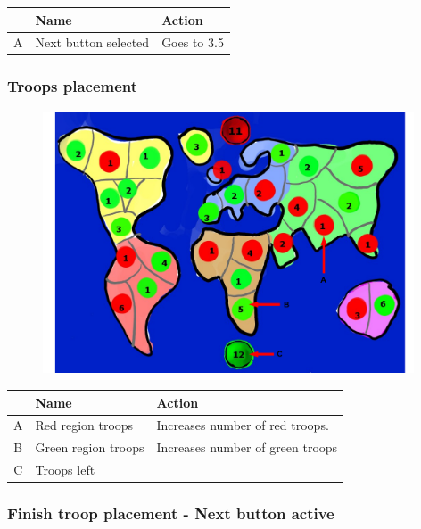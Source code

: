 \documentclass[12pt,a4paper]{article}
\begin{document}
\begin{table}[H]
\small
\centering
\begin{tabular}{c|p{5cm}|p{7cm}}
& Name & Action \\ \hline\hline
A
&Next button selected
&Goes to 3.5
\end{tabular}
\end{table}


\newpage
\subsubsection{Troops placement}

\begin{figure}[H]
  \centering
  \includegraphics[width=11cm]{pic/mocks/3-5.pdf}
\end{figure}

\begin{table}[H]
\small
\centering
\begin{tabular}{c|p{5cm}|p{7cm}}
& Name & Action \\ \hline\hline
A
&Red region troops
&Increases number of red troops.
\\B
&Green region troops
&Increases number of green troops
\\C
&Troops left
&
\end{tabular}
\end{table}

\newpage
\subsubsection{Finish troop placement - Next button active}
\end{document}
